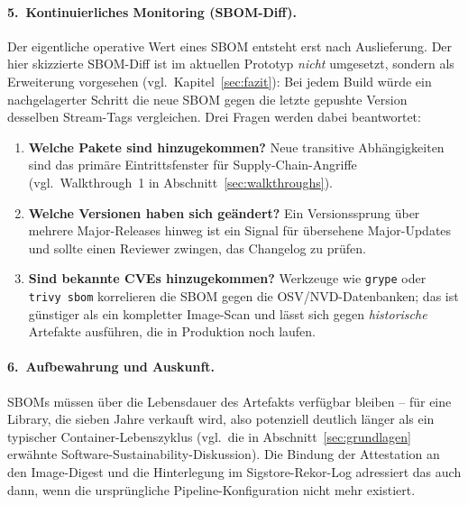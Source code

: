 \documentclass[12pt, a4paper]{scrartcl}
\begin{document}
\paragraph{5.~Kontinuierliches Monitoring (SBOM-Diff).}
Der eigentliche operative Wert eines SBOM entsteht erst nach
Auslieferung. Der hier skizzierte SBOM-Diff ist im aktuellen Prototyp
\emph{nicht} umgesetzt, sondern als Erweiterung vorgesehen (vgl.\
Kapitel~\ref{sec:fazit}): Bei jedem Build würde ein nachgelagerter
Schritt die neue SBOM gegen die letzte gepushte Version desselben
Stream-Tags vergleichen. Drei Fragen werden dabei beantwortet:
\begin{enumerate}[leftmargin=1.4em]
  \item \textbf{Welche Pakete sind hinzugekommen?} Neue transitive
        Abhängigkeiten sind das primäre Eintrittsfenster für
        Supply-Chain-Angriffe (vgl.\ Walkthrough~1 in
        Abschnitt~\ref{sec:walkthroughs}).
  \item \textbf{Welche Versionen haben sich geändert?} Ein
        Versionssprung über mehrere Major-Releases hinweg ist ein
        Signal für übersehene Major-Updates und sollte einen Reviewer
        zwingen, das Changelog zu prüfen.
  \item \textbf{Sind bekannte CVEs hinzugekommen?} Werkzeuge wie
        \texttt{grype} oder \texttt{trivy sbom} korrelieren die SBOM
        gegen die OSV/NVD-Datenbanken; das ist günstiger als ein
        kompletter Image-Scan und lässt sich gegen \emph{historische}
        Artefakte ausführen, die in Produktion noch laufen.
\end{enumerate}

\paragraph{6.~Aufbewahrung und Auskunft.}
SBOMs müssen über die Lebensdauer des Artefakts verfügbar bleiben --
für eine Library, die sieben Jahre verkauft wird, also potenziell
deutlich länger als ein typischer Container-Lebenszyklus
(vgl.\ die in Abschnitt~\ref{sec:grundlagen} erwähnte
Software-Sustainability-Diskussion). Die Bindung der Attestation an
den Image-Digest und die Hinterlegung im Sigstore-Rekor-Log adressiert
das auch dann, wenn die ursprüngliche Pipeline-Konfiguration nicht
mehr existiert.
\end{document}
